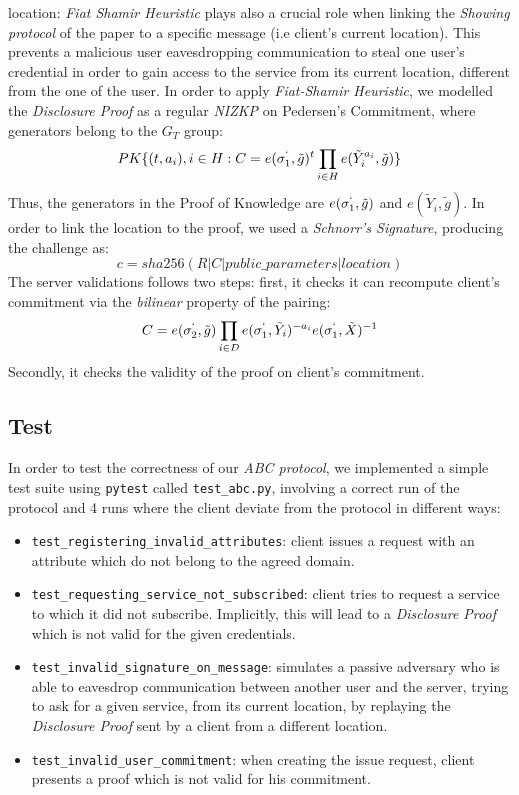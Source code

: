 \documentclass[10pt,conference,compsocconf]{IEEEtran}
\begin{document}
\begin{itemize}
{    location}: \textit{Fiat Shamir Heuristic} plays also a crucial role when
    linking the \textit{Showing protocol} of the paper to a specific message
    (i.e client's current location). This prevents a malicious user
    eavesdropping communication to steal one user's credential in order to gain
    access to the service from its current location, different from the one of the user. In order to apply
    \textit{Fiat-Shamir Heuristic}, we modelled the \textit{Disclosure Proof} as
    a regular \textit{NIZKP} on Pedersen's Commitment, where generators belong
    to the $G_T$ group: \[PK\{(t,a_i), i \in H : C=e(\sigma_{1}^{`},
    \tilde{g})^t\prod_{i \in H}e(\tilde{Y}_{i}^{a_i},\tilde{g})\}\]
    Thus, the generators in the Proof of Knowledge are $e(\sigma_{1}^{`}, \tilde{g})$ and
    $e(\tilde{Y}_{i},\tilde{g})$. In order to link the location to the
    proof, we used a \textit{Schnorr's Signature}, producing the challenge as:
    \[c = sha256(R|C|public\_parameters|location)\]
    The server validations follows two steps: first, it checks it can recompute client's commitment via
    the \textit{bilinear} property of the pairing:
    \[C = e(\sigma_2^`,\tilde{g})\prod_{i \in
    D}e(\sigma_1^`,\tilde{Y}_i)^{-a_i}e(\sigma_1^`,\tilde{X})^{-1}\] Secondly,
    it checks the validity of the proof on client's commitment.
\end{itemize}
\subsection{Test}
In order to test the correctness of our \textit{ABC protocol}, we implemented a
simple test suite using \texttt{pytest} called \texttt{test\_abc.py}, involving
a correct run of the protocol and 4 runs where the client deviate from the
protocol in different ways:
\begin{itemize}
    \item \texttt{test\_registering\_invalid\_attributes}: client issues a
    request with an attribute which do not belong to the agreed domain.
    \item \texttt{test\_requesting\_service\_not\_subscribed}: client tries to
    request a service to which it did not subscribe. Implicitly, this will lead
    to a \textit{Disclosure Proof} which is not valid for the given credentials.
    \item \texttt{test\_invalid\_signature\_on\_message}: simulates a passive
    adversary who is able to eavesdrop communication between another user and
    the server, trying to ask for a given service, from its current location, by
    replaying the \textit{Disclosure Proof} sent by a client from a different
    location.
    \item \texttt{test\_invalid\_user\_commitment}: when creating the issue
    request, client presents a proof which is not valid for his commitment.
\end{itemize}
\end{document}
